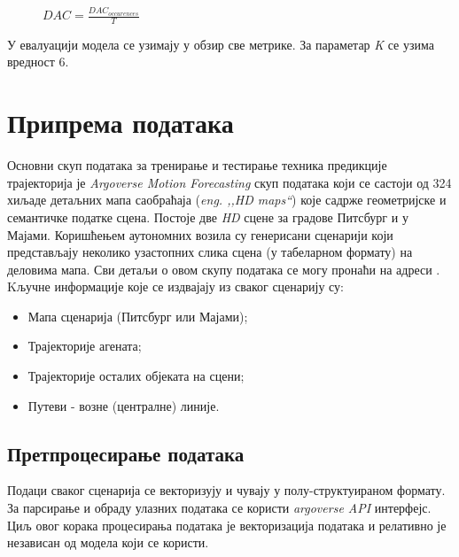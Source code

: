\documentclass[11pt,oneside]{memoir}
\begin{document}
\begin{figure}[H]
  \centering
  $DAC = \frac{DAC_{occurences}}{T}$
\end{figure}

У евалуацији модела се узимају у обзир све метрике. За параметар \textit{K} се узима вредност 6.

\chapter{Припрема података}

Основни скуп података за тренирање и тестирање техника предикције трајекторија је \textit{Argoverse Motion Forecasting} скуп података
који се састоји од 324 хиљаде детаљних мапа саобраћаја (\textit{eng. ,,HD maps``}) које садрже геометријске и семантичке податке сцена. Постоје две \textit{HD} сцене
за градове Питсбург и у Мајами. Коришћењем аутономних возила су генерисани сценарији који представљају неколико узастопних слика сцена (у табеларном формату)
на деловима мапа. Сви детаљи о овом скупу података се могу пронаћи на адреси 
\href{https://www.argoverse.org/index.html}{\color{blue}{www.argoverse.org}} \cite{argoverse}. \\


\noindent Kључне информације које се издвајају из сваког сценарију су:
\begin{itemize}
  \item Мапа сценарија (Питсбург или Мајами);
  \item Трајекторије агената;
  \item Трајекторије осталих објеката на сцени;
  \item Путеви - возне (централне) линије.
\end{itemize}

\section{Претпроцесирање података}

Подаци сваког сценарија се векторизују и чувају у полу-структуираном формату. 
За парсирање и обраду улазних података се користи \textit{argoverse API} интерфејс. Циљ овог корака процесирања података
је векторизација података и релативно је независан од модела који се користи.
\end{document}
